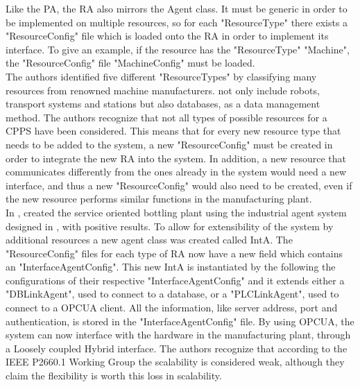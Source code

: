 Like the \acrshort{PA}, the \acrshort{RA} also mirrors the Agent class. It must be generic in order to be implemented on multiple resources, so for each "ResourceType" there exists a "ResourceConfig" file which is loaded onto the \acrshort{RA} in order to implement its interface. To give an example, if the resource has the "ResourceType" "Machine", the "ResourceConfig" file "MachineConfig" must be loaded.\\

The authors identified five different "ResourceTypes" by classifying many resources from renowned machine manufacturers.  not only include robots, transport systems and stations but also databases, as a data management method. The authors recognize that not all types of possible resources for a \acrshort{CPPS} have been considered. This means that for every new resource type that needs to be added to the system, a new "ResourceConfig" must be created in order to integrate the new \acrshort{RA} into the system. In addition, a new resource that communicates differently from the ones already in the system would need a new interface, and thus a new "ResourceConfig" would also need to be created, even if the new resource performs similar functions in the manufacturing plant.\\

In \cite{bottling_plant_part2}, \citeauthor{bottling_plant_part2} created the service oriented bottling plant using the industrial agent system designed in \cite{bottling_plant_part1}, with positive results. To allow for extensibility of the system by additional resources a new agent class was created called \acrfull{IntA}. The "ResourceConfig" files for each type of \acrshort{RA} now have a new field which contains an "InterfaceAgentConfig". This new \acrshort{IntA} is instantiated by the  following the configurations of their respective "InterfaceAgentConfig" and it extends either a "DBLinkAgent", used to connect to a database, or a "PLCLinkAgent", used to connect to a \acrshort{OPCUA} client. All the information, like server address, port and authentication, is stored in the "InterfaceAgentConfig" file. By using \acrshort{OPCUA}, the system can now interface with the hardware in the manufacturing plant, through a Loosely coupled Hybrid interface. The authors recognize that according to the IEEE P2660.1 Working Group the scalability is considered weak, although they claim the flexibility is worth this loss in scalability.\\

